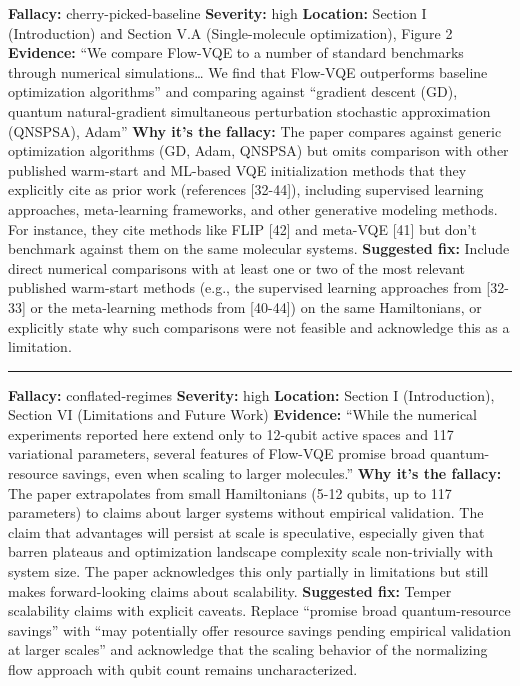 \documentclass[10pt,letterpaper]{article}
\begin{document}
\textbf{Fallacy:} cherry-picked-baseline
\textbf{Severity:} high
\textbf{Location:} Section I (Introduction) and Section V.A (Single-molecule optimization), Figure 2
\textbf{Evidence:} ``We compare Flow-VQE to a number of standard benchmarks through numerical simulations\ldots{} We find that Flow-VQE outperforms baseline optimization algorithms'' and comparing against ``gradient descent (GD), quantum natural-gradient simultaneous perturbation stochastic approximation (QNSPSA), Adam''
\textbf{Why it's the fallacy:} The paper compares against generic optimization algorithms (GD, Adam, QNSPSA) but omits comparison with other published warm-start and ML-based VQE initialization methods that they explicitly cite as prior work (references {[}32-44{]}), including supervised learning approaches, meta-learning frameworks, and other generative modeling methods. For instance, they cite methods like FLIP {[}42{]} and meta-VQE {[}41{]} but don't benchmark against them on the same molecular systems.
\textbf{Suggested fix:} Include direct numerical comparisons with at least one or two of the most relevant published warm-start methods (e.g., the supervised learning approaches from {[}32-33{]} or the meta-learning methods from {[}40-44{]}) on the same Hamiltonians, or explicitly state why such comparisons were not feasible and acknowledge this as a limitation.

\begin{center}\rule{0.5\linewidth}{0.5pt}\end{center}

\textbf{Fallacy:} conflated-regimes
\textbf{Severity:} high
\textbf{Location:} Section I (Introduction), Section VI (Limitations and Future Work)
\textbf{Evidence:} ``While the numerical experiments reported here extend only to 12-qubit active spaces and 117 variational parameters, several features of Flow-VQE promise broad quantum-resource savings, even when scaling to larger molecules.''
\textbf{Why it's the fallacy:} The paper extrapolates from small Hamiltonians (5-12 qubits, up to 117 parameters) to claims about larger systems without empirical validation. The claim that advantages will persist at scale is speculative, especially given that barren plateaus and optimization landscape complexity scale non-trivially with system size. The paper acknowledges this only partially in limitations but still makes forward-looking claims about scalability.
\textbf{Suggested fix:} Temper scalability claims with explicit caveats. Replace ``promise broad quantum-resource savings'' with ``may potentially offer resource savings pending empirical validation at larger scales'' and acknowledge that the scaling behavior of the normalizing flow approach with qubit count remains uncharacterized.
\end{document}
